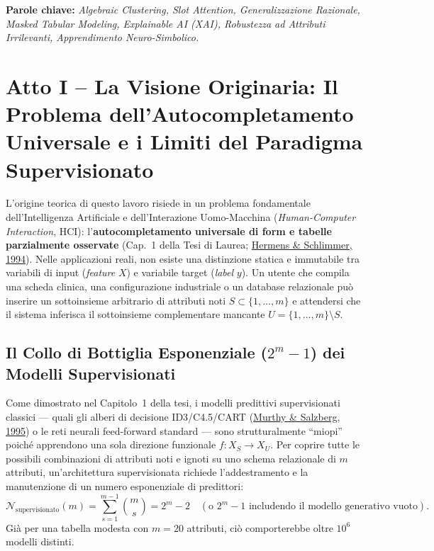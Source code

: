 \documentclass[10pt,a4paper]{article}
\begin{document}
\vspace{0.2cm}
\noindent\textbf{Parole chiave:} \textit{Algebraic Clustering, Slot Attention, Generalizzazione Razionale, Masked Tabular Modeling, Explainable AI (XAI), Robustezza ad Attributi Irrilevanti, Apprendimento Neuro-Simbolico.}

\section{Atto I -- La Visione Originaria: Il Problema dell'Autocompletamento Universale e i Limiti del Paradigma Supervisionato}

L'origine teorica di questo lavoro risiede in un problema fondamentale dell'Intelligenza Artificiale e dell'Interazione Uomo-Macchina (\textit{Human-Computer Interaction}, HCI): l'\textbf{autocompletamento universale di form e tabelle parzialmente osservate} (Cap.~1 della Tesi di Laurea; \href{https://dblp.org/pid/s/JeffreyCSchlimmer}{Hermens \& Schlimmer, 1994}). Nelle applicazioni reali, non esiste una distinzione statica e immutabile tra variabili di input (\textit{feature} $X$) e variabile target (\textit{label} $y$). Un utente che compila una scheda clinica, una configurazione industriale o un database relazionale pu\`o inserire un sottoinsieme arbitrario di attributi noti $S \subset \{1, \dots, m\}$ e attendersi che il sistema inferisca il sottoinsieme complementare mancante $U = \{1, \dots, m\} \setminus S$.

\subsection{Il Collo di Bottiglia Esponenziale \texorpdfstring{($2^m - 1$)}{(2\^{}m - 1)} dei Modelli Supervisionati}
Come dimostrato nel Capitolo~1 della tesi, i modelli predittivi supervisionati classici --- quali gli alberi di decisione ID3/C4.5/CART (\href{https://ijcai.org/proceedings/1995/133}{Murthy \& Salzberg, 1995}) o le reti neurali feed-forward standard --- sono strutturalmente ``miopi'' poich\'e apprendono una sola direzione funzionale $f: X_S \rightarrow X_U$. Per coprire tutte le possibili combinazioni di attributi noti e ignoti su uno schema relazionale di $m$ attributi, un'architettura supervisionata richiede l'addestramento e la manutenzione di un numero esponenziale di predittori:
\begin{equation}
\mathcal{N}_{\text{supervisionato}}(m) = \sum_{s=1}^{m-1} \binom{m}{s} = 2^m - 2 \quad (\text{o } 2^m - 1 \text{ includendo il modello generativo vuoto}).
\end{equation}
Gi\`a per una tabella modesta con $m = 20$ attributi, ci\`o comporterebbe oltre $10^6$ modelli distinti.
\end{document}

